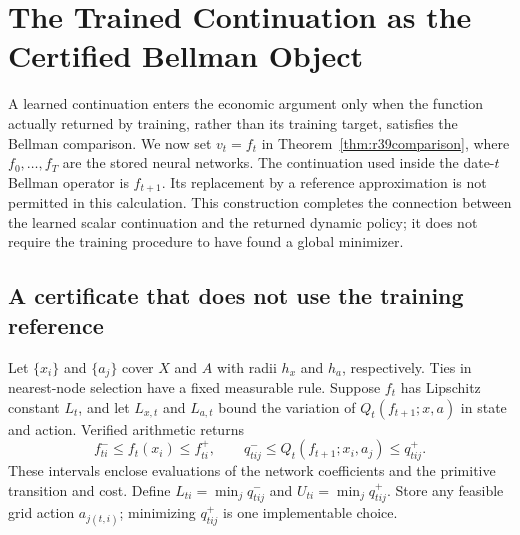 \section{The Trained Continuation as the Certified Bellman Object}
\label{sec:r41direct}
A learned continuation enters the economic argument only when the function
actually returned by training, rather than its training target, satisfies the
Bellman comparison. We now set $v_t=f_t$ in
Theorem~\ref{thm:r39comparison}, where $f_0,\ldots,f_T$ are the stored neural
networks. The continuation used inside the date-$t$ Bellman operator is
$f_{t+1}$. Its replacement by a reference approximation is not permitted in
this calculation. This construction completes the connection between the
learned scalar continuation and the returned dynamic policy; it does not
require the training procedure to have found a global minimizer.

\subsection{A certificate that does not use the training reference}
Let $\{x_i\}$ and $\{a_j\}$ cover $X$ and $A$ with radii $h_x$ and $h_a$,
respectively. Ties in nearest-node selection have a fixed measurable rule.
Suppose $f_t$ has Lipschitz constant $L_t$, and let $L_{x,t}$ and $L_{a,t}$
bound the variation of $Q_t(f_{t+1};x,a)$ in state and action. Verified
arithmetic returns
\[
 f^-_{ti}\leq f_t(x_i)\leq f^+_{ti},\qquad
 q^-_{tij}\leq Q_t(f_{t+1};x_i,a_j)\leq q^+_{tij}.
\]
These intervals enclose evaluations of the network coefficients and the
primitive transition and cost. Define $L_{ti}=\min_jq^-_{tij}$ and
$U_{ti}=\min_jq^+_{tij}$. Store any feasible grid action $a_{j(t,i)}$;
minimizing $q^+_{tij}$ is one implementable choice.

